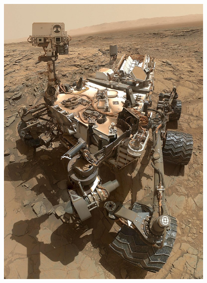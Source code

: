 \begin{minipage}[t]{0.48\textwidth} \begin{flushleft}\vspace{-2ex}
		\includegraphics[width=0.8\textwidth]{image/curiosity_rover}
		\label{fig:curiosity_rover}
\end{flushleft}\end{minipage}
